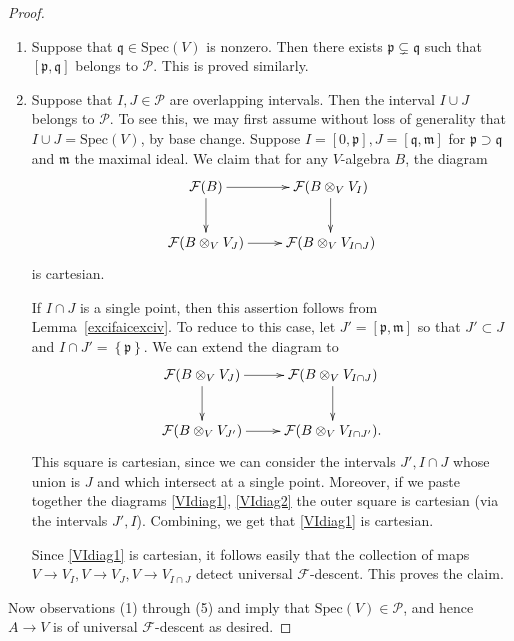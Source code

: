 \documentclass[reqno]{amsart}
\newcommand{\sF}{\mathcal{F}}
\newcommand{\spec}{\mathrm{Spec}}
\theoremstyle{definition}
\begin{document}
\begin{proof}
\begin{enumerate}
Now $\kappa( \mathfrak{p}) \to A \otimes_V \kappa( \mathfrak{p}) $ is  a 
$v$-cover and is finitely presented. 
Therefore, by Lemma~\ref{Descinvlimv}, there exists $I = [\mathfrak{p}, \mathfrak{q}]$ for
$\mathfrak{q} \supsetneq \mathfrak{p}$ such that $V_I \to A \otimes_V V_I$ is a
$v$-cover and hence of universal $\sF$-descent. Thus $I \in \mathcal{P}$. 

\item 
Suppose that $\mathfrak{q} \in \spec(V)$ is nonzero. Then there exists 
$\mathfrak{p} \subsetneq \mathfrak{q}$ such that $[\mathfrak{p}, \mathfrak{q}]$
belongs to $\mathcal{P}$. This is proved similarly.

\item 
Suppose that $I, J \in \mathcal{P}$ are overlapping intervals. Then the interval $I
\cup J$ belongs to $\mathcal{P}$. 
To see this, we may first assume without loss of generality that $I \cup J =
\spec(V)$, by base change. Suppose $I = [0, \mathfrak{p}], J = [\mathfrak{q},
\mathfrak{m}]$ for $\mathfrak{p} \supset \mathfrak{q}$ and $\mathfrak{m}$ the
maximal ideal. We claim that for any $V$-algebra $B$, the diagram
\begin{equation} \label{VIdiag1} \begin{aligned}\xymatrix{
\sF( B ) \ar[d] \ar[r] &  \sF( B \otimes_V V_I) \ar[d]  \\
\sF( B \otimes_V V_J) \ar[r] &  \sF( B \otimes_V V_{I \cap J})
} \end{aligned} \end{equation}
is cartesian. 

If $I \cap J$ is a single point, 
then this assertion follows from Lemma~\ref{excifaicexciv}. 
To reduce to this case, 
let $J' = [\mathfrak{p}, \mathfrak{m}]$ so that $J' \subset J$ and $I \cap J'
= \left\{\mathfrak{p}\right\}$. 
We 
can extend the diagram to 
\begin{equation} \label{VIdiag2} \begin{aligned} \xymatrix{
\sF( B \otimes_V V_J) \ar[r] \ar[d]  &  \sF( B \otimes_V V_{I \cap J}) \ar[d]  \\
\sF( B \otimes_V V_{J'}) \ar[r] &  \sF( B \otimes_V V_{I \cap J'}). 
}\end{aligned} \end{equation}
This square is cartesian, since we can consider the intervals $J', I \cap J$
whose union is $J$ and which intersect at a single point. 
Moreover, if we paste together the diagrams \eqref{VIdiag1}, \eqref{VIdiag2}
the outer square is cartesian (via the intervals $J', I$). Combining, we get
that \eqref{VIdiag1} is cartesian. 

Since \eqref{VIdiag1} is cartesian, it follows easily that the collection of maps $V \to V_I,
V \to V_J, V \to  V_{I \cap J}$ detect universal $\sF$-descent. This proves the claim. 
\end{enumerate}

Now observations (1) through (5) and  imply
that $\spec(V) \in \mathcal{P}$, and hence $A \to V$ is of universal
$\sF$-descent as desired. 
\end{proof} 
\end{document}
